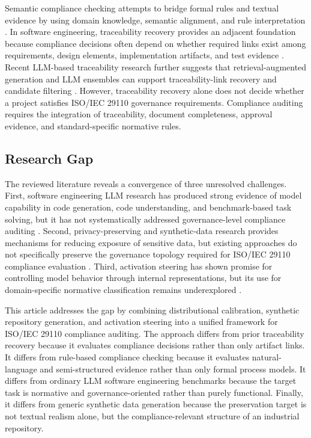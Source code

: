 \documentclass{ieeeaccess}
\begin{document}
Semantic compliance checking attempts to bridge formal rules and textual evidence by using domain knowledge, semantic alignment, and rule interpretation \cite{guo2021semantic,zheng2022semantic}. In software engineering, traceability recovery provides an adjacent foundation because compliance decisions often depend on whether required links exist among requirements, design elements, implementation artifacts, and test evidence \cite{antoniol2002traceability,borg2013traceability}. Recent LLM-based traceability research further suggests that retrieval-augmented generation and LLM ensembles can support traceability-link recovery and candidate filtering \cite{fuchss2025lissa,fuchss2025llmtrace}. However, traceability recovery alone does not decide whether a project satisfies ISO/IEC 29110 governance requirements. Compliance auditing requires the integration of traceability, document completeness, approval evidence, and standard-specific normative rules.

\subsection{Research Gap}
\label{subsec:rw_gap}

The reviewed literature reveals a convergence of three unresolved challenges. First, software engineering LLM research has produced strong evidence of model capability in code generation, code understanding, and benchmark-based task solving, but it has not systematically addressed governance-level compliance auditing \cite{jiang2024surveycodegen,lu2021codexglue,jimenez2023swebench,jain2024livecodebench}. Second, privacy-preserving and synthetic-data research provides mechanisms for reducing exposure of sensitive data, but existing approaches do not specifically preserve the governance topology required for ISO/IEC 29110 compliance evaluation \cite{bauer2024syntheticdata,dwork2006differentialprivacy,mcmahan2017communication,yang2025swesmith}. Third, activation steering has shown promise for controlling model behavior through internal representations, but its use for domain-specific normative classification remains underexplored \cite{zou2023representation,turner2023activation,li2023iti}.

This article addresses the gap by combining distributional calibration, synthetic repository generation, and activation steering into a unified framework for ISO/IEC 29110 compliance auditing. The approach differs from prior traceability recovery because it evaluates compliance decisions rather than only artifact links. It differs from rule-based compliance checking because it evaluates natural-language and semi-structured evidence rather than only formal process models. It differs from ordinary LLM software engineering benchmarks because the target task is normative and governance-oriented rather than purely functional. Finally, it differs from generic synthetic data generation because the preservation target is not textual realism alone, but the compliance-relevant structure of an industrial repository.
\end{document}

